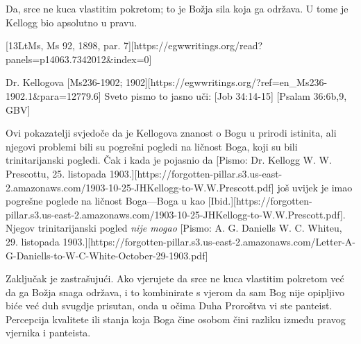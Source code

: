 Da, srce ne kuca vlastitim pokretom; to je Božja sila koja ga održava. U tome je Kellogg bio apsolutno u pravu.

[13LtMs, Ms 92, 1898, par. 7][https://egwwritings.org/read?panels=p14063.7342012&index=0]

Dr. Kellogova [Ms236-1902; 1902][https://egwwritings.org/?ref=en\_Ms236-1902.1&para=12779.6] Sveto pismo to jasno uči: [Job 34:14-15] [Psalam 36:6b,9, GBV]

Ovi pokazatelji svjedoče da je Kellogova znanost o Bogu u prirodi istinita, ali njegovi problemi bili su pogrešni pogledi na ličnost Boga, koji su bili trinitarijanski pogledi. Čak i kada je pojasnio da [Pismo: Dr. Kellogg W. W. Prescottu, 25. listopada 1903.][https://forgotten-pillar.s3.us-east-2.amazonaws.com/1903-10-25-JHKellogg-to-W.W.Prescott.pdf] još uvijek je imao pogrešne poglede na ličnost Boga—Boga u  kao [Ibid.][https://forgotten-pillar.s3.us-east-2.amazonaws.com/1903-10-25-JHKellogg-to-W.W.Prescott.pdf]. Njegov trinitarijanski pogled \textit{nije mogao} [Pismo: A. G. Daniells W. C. Whiteu, 29. listopada 1903.][https://forgotten-pillar.s3.us-east-2.amazonaws.com/Letter-A-G-Daniells-to-W-C-White-October-29-1903.pdf]

Zaključak je zastrašujući. Ako vjerujete da srce ne kuca vlastitim pokretom već da ga Božja snaga održava, i to kombinirate s vjerom da sam Bog nije opipljivo biće već duh svugdje prisutan, onda u očima Duha Proroštva vi ste panteist. Percepcija kvalitete ili stanja koja Boga čine osobom čini razliku između pravog vjernika i panteista.
